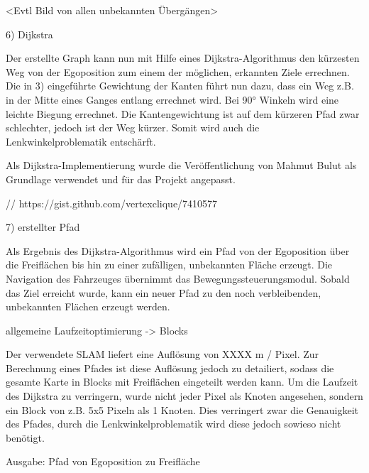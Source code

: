 <Evtl Bild von allen unbekannten Übergängen>


6) Dijkstra

Der erstellte Graph kann nun mit Hilfe eines Dijkstra-Algorithmus den kürzesten Weg von der Egoposition zum einem der möglichen, erkannten Ziele errechnen. Die in 3) eingeführte Gewichtung der Kanten führt nun dazu, dass ein Weg z.B. in der Mitte eines Ganges entlang errechnet wird. Bei 90° Winkeln wird eine leichte Biegung errechnet. Die Kantengewichtung ist auf dem kürzeren Pfad zwar schlechter, jedoch ist der Weg kürzer. Somit wird auch die Lenkwinkelproblematik entschärft. 

Als Dijkstra-Implementierung wurde die Veröffentlichung von Mahmut Bulut als Grundlage verwendet und für das Projekt angepasst.

// https://gist.github.com/vertexclique/7410577


7) erstellter Pfad

Als Ergebnis des Dijkstra-Algorithmus wird ein Pfad von der Egoposition über die Freiflächen bis hin zu einer zufälligen, unbekannten Fläche erzeugt. Die Navigation des Fahrzeuges übernimmt das Bewegungssteuerungsmodul. Sobald das Ziel erreicht wurde, kann ein neuer Pfad zu den noch verbleibenden, unbekannten Flächen erzeugt werden.



allgemeine Laufzeitoptimierung -> Blocks

Der verwendete SLAM liefert eine Auflösung von XXXX m / Pixel. Zur Berechnung eines Pfades ist diese Auflösung jedoch zu detailiert, sodass die gesamte Karte in Blocks mit Freiflächen eingeteilt werden kann. Um die Laufzeit des Dijkstra zu verringern, wurde nicht jeder Pixel als Knoten angesehen, sondern ein Block von z.B. 5x5 Pixeln als 1 Knoten. Dies verringert zwar die Genauigkeit des Pfades, durch die Lenkwinkelproblematik wird diese jedoch sowieso nicht benötigt.



Ausgabe:
Pfad von Egoposition zu Freifläche





